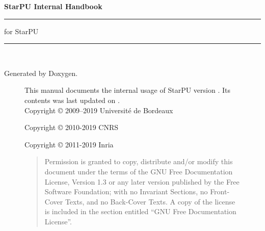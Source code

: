 %
%
%
%
%

\setlength{\parskip}{0pt}
\begin{titlepage}
\vspace*{4cm}
{\Huge \textbf{StarPU Internal Handbook}}\\
\rule{\textwidth}{1.5mm}
\begin{flushright}
{\Large for StarPU \STARPUVERSION}
\end{flushright}
\rule{\textwidth}{1mm}
~\\
\vspace*{15cm}
\begin{flushright}
Generated by Doxygen.
\end{flushright}
\end{titlepage}

\begin{figure}[p]
This manual documents the internal usage of StarPU version \STARPUVERSION. Its contents
was last updated on \STARPUUPDATED.\\

Copyright © 2009–2019 Université de Bordeaux

Copyright © 2010-2019 CNRS

Copyright © 2011-2019 Inria

\medskip

\begin{quote}
Permission is granted to copy, distribute and/or modify this document
under the terms of the GNU Free Documentation License, Version 1.3 or
any later version published by the Free Software Foundation; with no
Invariant Sections, no Front-Cover Texts, and no Back-Cover Texts. A
copy of the license is included in the section entitled “GNU Free
Documentation License”.
\end{quote}
\end{figure}

\setcounter{tocdepth}{2}
\tableofcontents
{}
\hypersetup{pageanchor=true,citecolor=blue}

